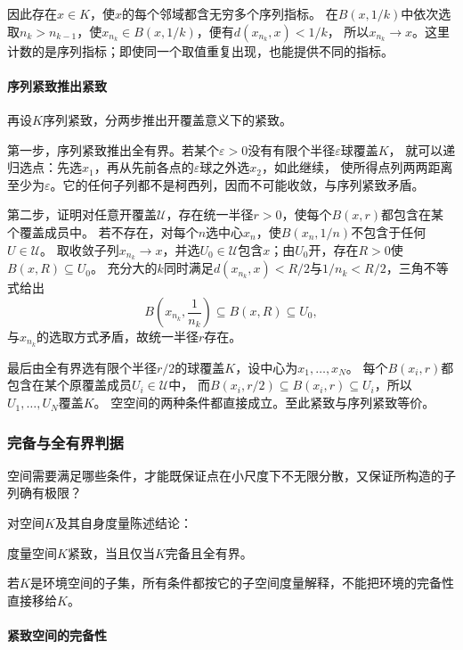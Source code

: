 因此存在$x\in K$，使$x$的每个邻域都含无穷多个序列指标。
在$B(x,1/k)$中依次选取$n_k>n_{k-1}$，使$x_{n_k}\in B(x,1/k)$，便有$d(x_{n_k},x)<1/k$，
所以$x_{n_k}\to x$。这里计数的是序列指标；即使同一个取值重复出现，也能提供不同的指标。

\paragraph{序列紧致推出紧致}

再设$K$序列紧致，分两步推出开覆盖意义下的紧致。

第一步，序列紧致推出全有界。若某个$\varepsilon>0$没有有限个半径$\varepsilon$球覆盖$K$，
就可以递归选点：先选$x_1$，再从先前各点的$\varepsilon$球之外选$x_2$，如此继续，
使所得点列两两距离至少为$\varepsilon$。它的任何子列都不是柯西列，因而不可能收敛，与序列紧致矛盾。

第二步，证明对任意开覆盖$\mathcal U$，存在统一半径$r>0$，使每个$B(x,r)$都包含在某个覆盖成员中。
若不存在，对每个$n$选中心$x_n$，使$B(x_n,1/n)$不包含于任何$U\in\mathcal U$。
取收敛子列$x_{n_k}\to x$，并选$U_0\in\mathcal U$包含$x$；由$U_0$开，存在$R>0$使$B(x,R)\subseteq U_0$。
充分大的$k$同时满足$d(x_{n_k},x)<R/2$与$1/n_k<R/2$，三角不等式给出
\[
  B\!\left(x_{n_k},\frac1{n_k}\right)\subseteq B(x,R)\subseteq U_0,
\]
与$x_{n_k}$的选取方式矛盾，故统一半径$r$存在。

最后由全有界选有限个半径$r/2$的球覆盖$K$，设中心为$x_1,\ldots,x_N$。
每个$B(x_i,r)$都包含在某个原覆盖成员$U_i\in\mathcal U$中，
而$B(x_i,r/2)\subseteq B(x_i,r)\subseteq U_i$，所以$U_1,\ldots,U_N$覆盖$K$。
空空间的两种条件都直接成立。至此紧致与序列紧致等价。

\subsubsection{完备与全有界判据}
\label{sec:metric-complete-totally-bounded}

空间需要满足哪些条件，才能既保证点在小尺度下不无限分散，又保证所构造的子列确有极限？

对空间$K$及其自身度量陈述结论：
\begin{theorem}[紧致的完备且全有界判据]
\label{thm:metric-complete-totally-bounded}
度量空间$K$紧致，当且仅当$K$完备且全有界。
\end{theorem}
若$K$是环境空间的子集，所有条件都按它的子空间度量解释，不能把环境的完备性直接移给$K$。

\paragraph{紧致空间的完备性}

